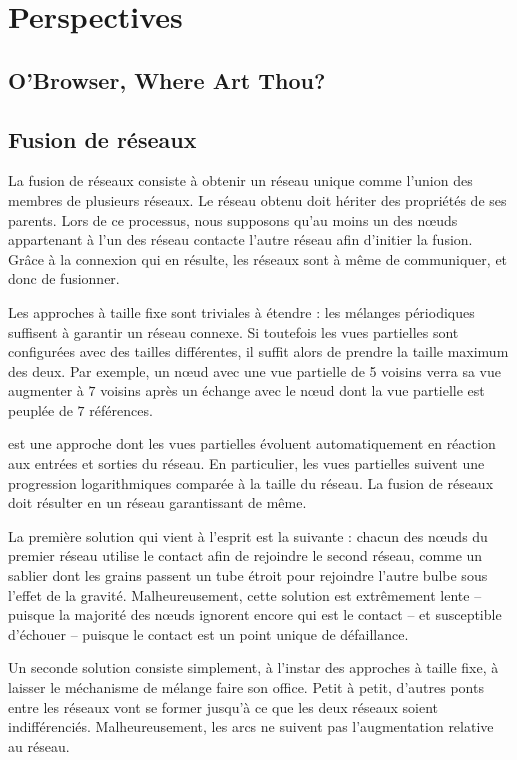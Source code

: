
\section{Perspectives}

\subsection{O'Browser, Where Art Thou?}

\subsection{Fusion de réseaux}

\label{net:sec:merging}

La fusion de réseaux consiste à obtenir un réseau unique comme l'union des
membres de plusieurs réseaux. Le réseau obtenu doit hériter des propriétés de
ses parents.  Lors de ce processus, nous supposons qu'au moins un des nœuds
appartenant à l'un des réseau contacte l'autre réseau afin d'initier la
fusion. Grâce à la connexion qui en résulte, les réseaux sont à même de
communiquer, et donc de fusionner.

Les approches à taille fixe sont triviales à étendre : les mélanges périodiques
suffisent à garantir un réseau connexe. Si toutefois les vues partielles sont
configurées avec des tailles différentes, il suffit alors de prendre la taille
maximum des deux. Par exemple, un nœud avec une vue partielle de 5 voisins verra
sa vue augmenter à $7$ voisins après un échange avec le nœud dont la vue
partielle est peuplée de $7$ références.

\SPRAY est une approche dont les vues partielles évoluent automatiquement en
réaction aux entrées et sorties du réseau. En particulier, les vues partielles
suivent une progression logarithmiques comparée à la taille du réseau. La fusion
de réseaux \SPRAY doit résulter en un réseau \SPRAY garantissant de même.

La première solution qui vient à l'esprit est la suivante : chacun des nœuds du
premier réseau utilise le contact afin de rejoindre le second réseau, comme un
sablier dont les grains passent un tube étroit pour rejoindre l'autre bulbe sous
l'effet de la gravité. Malheureusement, cette solution est extrêmement lente --
puisque la majorité des nœuds ignorent encore qui est le contact -- et
susceptible d'échouer -- puisque le contact est un point unique de défaillance.

Un seconde solution consiste simplement, à l'instar des approches à taille fixe,
à laisser le méchanisme de mélange faire son office. Petit à petit, d'autres
ponts entre les réseaux vont se former jusqu'à ce que les deux réseaux soient
indifférenciés. Malheureusement, les arcs ne suivent pas l'augmentation relative
au réseau.

